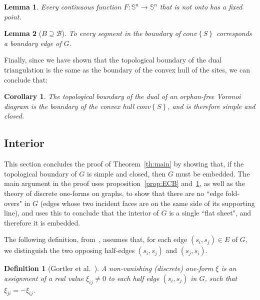 \documentclass[11pt]{article}
\newtheorem{lemma}{Lemma}
\newtheorem{definition}{Definition}
\newtheorem{corollary}{Corollary}
\newcommand{\Sites}{S}
\newcommand{\CHS}{{conv}\left\{\Sites\right\}}
\begin{document}
\begin{lemma}\label{lem:Sn}
	Every continuous function $F:\mathbb{S}^n\rightarrow\mathbb{S}^n$ that is not onto has a fixed point. 
\end{lemma}




\begin{lemma}[$B\supseteq\mathcal{B}$]\label{lem:hard}
 To every segment  in the boundary of
$\CHS$ corresponds a boundary edge of $G$.
\end{lemma}


Finally, since we have shown that the topological boundary of the dual triangulation is the 
	same as the boundary of the convex hull of the sites, we can conclude that:


\begin{corollary}\label{cor:boundary}
The topological boundary of the dual of an orphan-free Voronoi diagram 
	is the boundary of the convex hull $\CHS$, and is therefore simple and closed. 
\end{corollary}




\subsection{Interior}\label{sec:interior}


This section concludes the proof of Theorem~\ref{th:main} by showing that, 
	if the topological boundary of $G$ is simple and closed, then $G$ must be embedded.
The main argument in the proof 
uses proposition~\ref{prop:ECB} and~\ref{cor:boundary}, as well as the theory of discrete one-forms on graphs, 
to show that there are no
``edge fold-overs" in $G$ (edges whose two incident faces are on the same side of its supporting line), 
and uses this to conclude that the interior of $G$ is a single ``flat sheet", and therefore it is embedded. 




The following definition, from~\cite{1form},  assumes that, for each edge $(s_i,s_j)\in E$ of $G$, 
we distinguish the two opposing half-edges $(s_i,s_j)$ and $(s_j,s_i)$. 


\begin{definition}[Gortler et al.\ \cite{1form}]\label{def:1form}
A non-vanishing (discrete) one-form $\xi$  is an assignment of a real value
$\xi_{ij} \neq 0$ to each half edge $(s_i,s_j)$ in $G$, such that 
$\xi_{ji} = -\xi_{ij}$. 
\end{definition}
\end{document}
